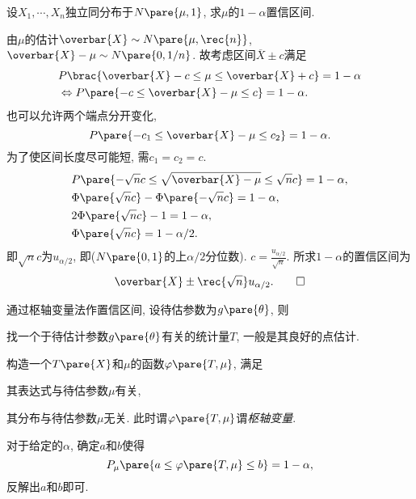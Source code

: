 \documentclass{ctexart}
\begin{document}
\begin{sample}
    \begin{ex}
        设$X_1,\cdots, X_n$独立同分布于$N\pare{\mu,1}$, 求$\mu$的$1-\alpha$置信区间.
    \end{ex}
    \begin{solution}
        由$\mu$的估计$\overbar{X} \sim N\pare{\mu,\rec{n}}$, $\overbar{X} - \mu \sim N\pare{0,1/n}$. 故考虑区间$\overbar{X}\pm c$满足
        \begin{align*}
            & P\brac{\overbar{X}-c \le \mu \le \overbar{X}+c} = 1-\alpha \\
            & \Leftrightarrow P\pare{-c \le \overbar{X}-\mu \le c} = 1-\alpha.
        \end{align*}
        也可以允许两个端点分开变化,
        \[ P\pare{-c_1 \le \overbar{X} - \mu \le c_2} = 1-\alpha. \]
        为了使区间长度尽可能短, 需$c_1 = c_2 = c$.
        \begin{align*}
            & P\pare{-\sqrt{n}c \le \sqrt{\overbar{X} - \mu} \le \sqrt{n}c} = 1-\alpha, \\
            & \Phi\pare{\sqrt{n}c} - \Phi\pare{-\sqrt{n}c} = 1-\alpha, \\
            & 2\Phi\pare{\sqrt{n}c} - 1 = 1-\alpha, \\
            & \Phi\pare{\sqrt{n}c} = 1-\alpha/2.
        \end{align*}
        即$\sqrt{n}c$为$u_{\alpha/2}$, 即($N\pare{0,1}$的上$\alpha/2$分位数). $\displaystyle c = \frac{u_{\alpha/2}}{\sqrt{n}}$. 所求$1-\alpha$的置信区间为
        \[ \overbar{X} \pm \rec{\sqrt{n}} u_{\alpha/2}. \qedhere \]
    \end{solution}
\end{sample}
通过枢轴变量法作置信区间, 设待估参数为$g\pare{\theta}$, 则
\begin{cenum}
    \item 找一个于待估计参数$g\pare{\theta}$有关的统计量$T$, 一般是其良好的点估计.
    \item 构造一个$T\pare{X}$和$\mu$的函数$\varphi\pare{T,\mu}$, 满足
    \begin{cenum}
        \item 其表达式与待估参数$\mu$有关,
        \item 其分布与待估参数$\mu$无关. 此时谓$\varphi\pare{T,\mu}$谓\emph{枢轴变量}.
    \end{cenum}
    \item 对于给定的$\alpha$, 确定$a$和$b$使得
    \[ P_\mu\pare{a\le \varphi\pare{T,\mu}\le b} = 1-\alpha, \]
    反解出$a$和$b$即可.
\end{cenum}
\end{document}
